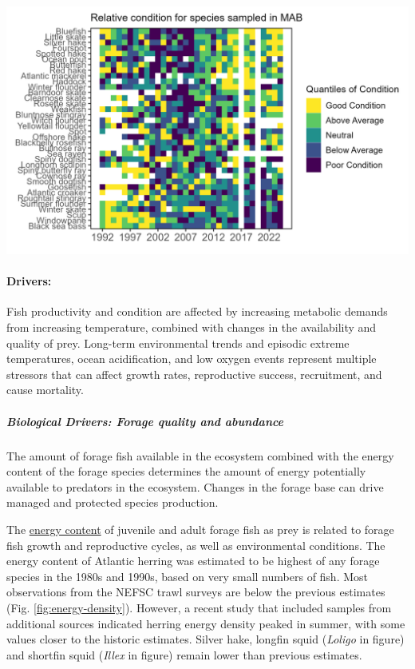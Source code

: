 \documentclass[
  10pt,
]{article}
\let\origfigure\figure
\let\endorigfigure\endfigure
\renewenvironment{figure}[1][2] {
    \expandafter\origfigure\expandafter[H]
} {
    \endorigfigure
}
\begin{document}
\begin{figure}

{\centering \includegraphics[width=6.5in]{images/MidAtlantic/condition_MidAtlantic_2025-09-05} 

}

\caption{Condition factor for fish species in the MAB based on fall NEFSC bottom trawl survey data. MAB data are missing for 2017 due to survey delays, and no survey was conducted in 2020.}\label{fig:mab-cf}
\end{figure}

\paragraph{Drivers:}\label{drivers-2}

Fish productivity and condition are affected by increasing metabolic demands from increasing temperature, combined with changes in the availability and quality of prey. Long-term environmental trends and episodic extreme temperatures, ocean acidification, and low oxygen events represent multiple stressors that can affect growth rates, reproductive success, recruitment, and cause mortality.

\subparagraph{Biological Drivers: Forage quality and abundance}\label{biological-drivers-forage-quality-and-abundance}

The amount of forage fish available in the ecosystem combined with the energy content of the forage species determines the amount of energy potentially available to predators in the ecosystem. Changes in the forage base can drive managed and protected species production.

The \href{https://noaa-edab.github.io/catalog/energy_density.html}{energy content} of juvenile and adult forage fish as prey is related to forage fish growth and reproductive cycles, as well as environmental conditions. The energy content of Atlantic herring was estimated to be highest of any forage species in the 1980s and 1990s, based on very small numbers of fish. Most observations from the NEFSC trawl surveys are below the previous estimates (Fig. \ref{fig:energy-density}). However, a recent study that included samples from additional sources indicated herring energy density peaked in summer, with some values closer to the historic estimates. Silver hake, longfin squid (\emph{Loligo} in figure) and shortfin squid (\emph{Illex} in figure) remain lower than previous estimates.
\end{document}
